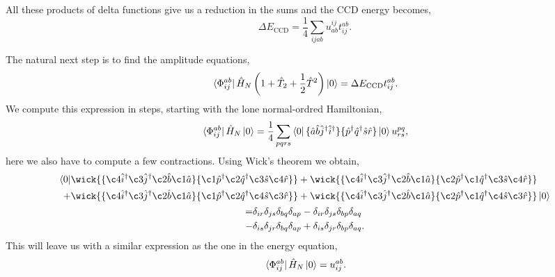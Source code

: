 All these products of delta functions give us a reduction in the sums and the CCD
energy becomes,
\begin{equation}
    \Delta E_{\text{CCD}} = \frac{1}{4}\sum_{ijab} u^{ij}_{ab} t^{ab}_{ij}.
\end{equation}

The natural next step is to find the amplitude equations,
\begin{equation}
    \bra*{\Phi^{ab}_{ij}}\hat{H}_N\left(1 + \hat{T}_2 + \frac{1}{2}\hat{T}^2\right) \ket{0}
        = \Delta E_{\text{CCD}} t^{ab}_{ij}.
\end{equation}
We compute this expression in steps, starting with the lone normal-ordred Hamiltonian,
\begin{equation}
    \bra*{\Phi^{ab}_{ij}} \hat{H}_N \ket{0}
        = \frac{1}{4}\sum_{pqrs} \bra{0}
        \{\hat{a}\hat{b}\hat{j}^\dagger\hat{i}^\dagger\}
        \{\hat{p}^\dagger\hat{q}^\dagger\hat{s}\hat{r}\}
        \ket{0} u^{pq}_{rs},
\end{equation}
here we also have to compute a few contractions. Using Wick's theorem we obtain,
\begin{gather}
    \begin{aligned}
        \bra{0}
        &\wick{
        \{ \c4{\hat{i}}^\dagger \c3{\hat{j}}^\dagger \c2{\hat{b}} \c1{\hat{a}}\}
        \{ \c1{\hat{p}}^\dagger \c2{\hat{q}}^\dagger \c3{\hat{s}} \c4{\hat{r}} \}
        }
        +\wick{
        \{ \c4{\hat{i}}^\dagger \c3{\hat{j}}^\dagger \c2{\hat{b}} \c1{\hat{a}}\}
        \{ \c2{\hat{p}}^\dagger \c1{\hat{q}}^\dagger \c3{\hat{s}} \c4{\hat{r}} \}
        } \\
        +&\wick{
        \{ \c4{\hat{i}}^\dagger \c3{\hat{j}}^\dagger \c2{\hat{b}} \c1{\hat{a}}\}
        \{ \c1{\hat{p}}^\dagger \c2{\hat{q}}^\dagger \c4{\hat{s}} \c3{\hat{r}} \}
        }
        +\wick{
        \{ \c4{\hat{i}}^\dagger \c3{\hat{j}}^\dagger \c2{\hat{b}} \c1{\hat{a}}\}
        \{ \c2{\hat{p}}^\dagger \c1{\hat{q}}^\dagger \c4{\hat{s}} \c3{\hat{r}} \}
        }
        \ket{0}
    \end{aligned} \\
    \begin{aligned}
        =&\delta_{ir}\delta_{js}\delta_{bq}\delta_{ap} 
        -\delta_{ir}\delta_{js}\delta_{bp}\delta_{aq}\\
        -&\delta_{is}\delta_{jr}\delta_{bq}\delta_{ap}
        +\delta_{is}\delta_{jr}\delta_{bp}\delta_{aq}.
    \end{aligned} 
\end{gather}
This will leave us with a similar expression as the one in the energy equation,
\begin{equation}
    \bra*{\Phi^{ab}_{ij}} \hat{H}_N \ket{0} = u^{ab}_{ij}.
\end{equation}

